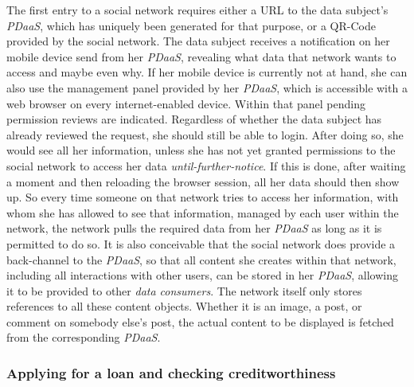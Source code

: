 \documentclass[12pt,english,a4paper,titlepage,cleardoublepage=empty,dottedtoc]{report}
\begin{document}
The first entry to a social network requires either a URL to the data
subject's \emph{PDaaS}, which has uniquely been generated for that
purpose, or a QR-Code provided by the social network. The data subject
receives a notification on her mobile device send from her \emph{PDaaS},
revealing what data that network wants to access and maybe even why. If
her mobile device is currently not at hand, she can also use the
management panel provided by her \emph{PDaaS}, which is accessible with
a web browser on every internet-enabled device. Within that panel
pending permission reviews are indicated. Regardless of whether the data
subject has already reviewed the request, she should still be able to
login. After doing so, she would see all her information, unless she has
not yet granted permissions to the social network to access her data
\emph{until-further-notice}. If this is done, after waiting a moment and
then reloading the browser session, all her data should then show up. So
every time someone on that network tries to access her information, with
whom she has allowed to see that information, managed by each user
within the network, the network pulls the required data from her
\emph{PDaaS} as long as it is permitted to do so. It is also conceivable
that the social network does provide a back-channel to the \emph{PDaaS},
so that all content she creates within that network, including all
interactions with other users, can be stored in her \emph{PDaaS},
allowing it to be provided to other \emph{data consumers}. The network
itself only stores references to all these content objects. Whether it
is an image, a post, or comment on somebody else's post, the actual
content to be displayed is fetched from the corresponding \emph{PDaaS}.

\subsubsection*{Applying for a loan and checking
creditworthiness}\label{applying-for-a-loan-and-checking-creditworthiness}
\end{document}
